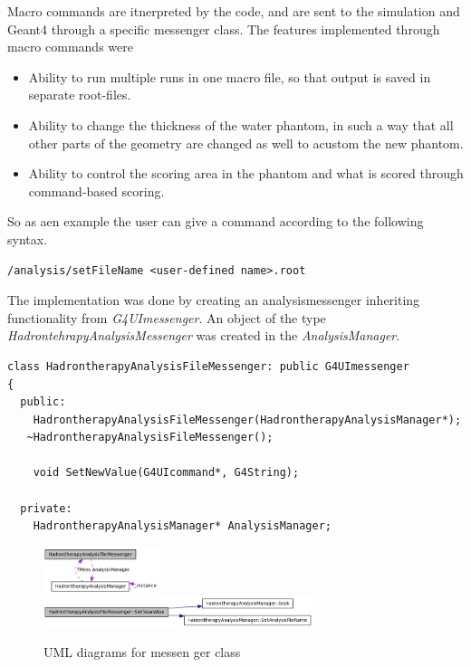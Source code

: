 Macro commands are itnerpreted by the code, and are sent to the simulation and Geant4 through a specific messenger class. The features implemented through macro commands were
\begin{itemize}
 \item Ability to run multiple runs in one macro file, so that output is saved in separate root-files.
\item Ability to change the thickness of the water phantom, in such a way that all other parts of the geometry are changed as well to acustom the new phantom.
\item Ability to control the scoring area in the phantom and what is scored through command-based scoring.
\end{itemize}


So as aen example the user can give a command according to the following syntax.
\scriptsize
\begin{verbatim}
/analysis/setFileName <user-defined name>.root
\end{verbatim}
\normalsize

The implementation was done by creating an analysismessenger inheriting functionality from \textit{G4UImessenger}. An object of the type \textit{HadrontehrapyAnalysisMessenger} was created in the \textit{AnalysisManager}.


\scriptsize
\begin{verbatim}
class HadrontherapyAnalysisFileMessenger: public G4UImessenger
{
  public:
    HadrontherapyAnalysisFileMessenger(HadrontherapyAnalysisManager*);
   ~HadrontherapyAnalysisFileMessenger();
    
    void SetNewValue(G4UIcommand*, G4String);
    
  private:
    HadrontherapyAnalysisManager* AnalysisManager;
\end{verbatim}
\normalsize
\begin{figure}[h] 
\begin{center}
\includegraphics[width=0.3\textwidth]{images/setFileNameMessenger_1.png}  
\includegraphics[width=0.7\textwidth]{images/setFileNameMessenger_2.png}  
\caption{\label{fig:messengerUML} UML diagrams for messen ger class}
 
 \end{center}
 \end{figure}


